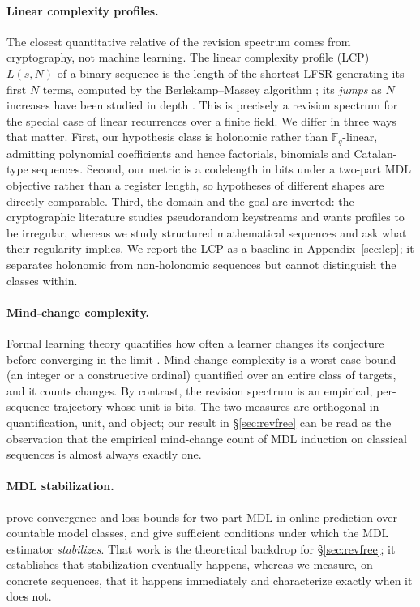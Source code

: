 \documentclass[10pt]{article}
\theoremstyle{definition}
\theoremstyle{plain}
\begin{document}
\paragraph{Linear complexity profiles.} The closest quantitative relative of
the revision spectrum comes from cryptography, not machine learning. The
linear complexity profile (LCP) $L(s,N)$ of a binary sequence is the length of
the shortest LFSR generating its first $N$ terms, computed by the
Berlekamp--Massey algorithm \citep{massey1969}; its \emph{jumps} as $N$
increases have been studied in depth
\citep{rueppel1986,niederreiter1990,wangmassey1986}. This is precisely a
revision spectrum for the special case of linear recurrences over a finite
field. We differ in three ways that matter. First, our hypothesis class is
holonomic rather than $\mathbb{F}_q$-linear, admitting polynomial coefficients
and hence factorials, binomials and Catalan-type sequences. Second, our metric
is a codelength in bits under a two-part MDL objective rather than a register
length, so hypotheses of different shapes are directly comparable. Third, the
domain and the goal are inverted: the cryptographic literature studies
pseudorandom keystreams and wants profiles to be irregular, whereas we study
structured mathematical sequences and ask what their regularity implies. We
report the LCP as a baseline in Appendix~\ref{sec:lcp}; it separates holonomic
from non-holonomic sequences but cannot distinguish the classes within.

\paragraph{Mind-change complexity.} Formal learning theory quantifies how
often a learner changes its conjecture before converging in the limit
\citep{gold1967,freivalds1993,ambainis1999}. Mind-change complexity is a
worst-case bound (an integer or a constructive ordinal) quantified over an
entire class of targets, and it counts changes. By contrast, the revision
spectrum is an empirical, per-sequence trajectory whose unit is bits. The two
measures are orthogonal in quantification, unit, and object; our result in
\S\ref{sec:revfree} can be read as the observation that the empirical
mind-change count of MDL induction on classical sequences is almost always
exactly one.

\paragraph{MDL stabilization.} \citet{poland2006} prove convergence and loss
bounds for two-part MDL in online prediction over countable model classes, and
give sufficient conditions under which the MDL estimator \emph{stabilizes}.
That work is the theoretical backdrop for \S\ref{sec:revfree}; it establishes that
stabilization eventually happens, whereas we measure, on concrete sequences,
that it happens immediately and characterize exactly when it does not.
\end{document}
